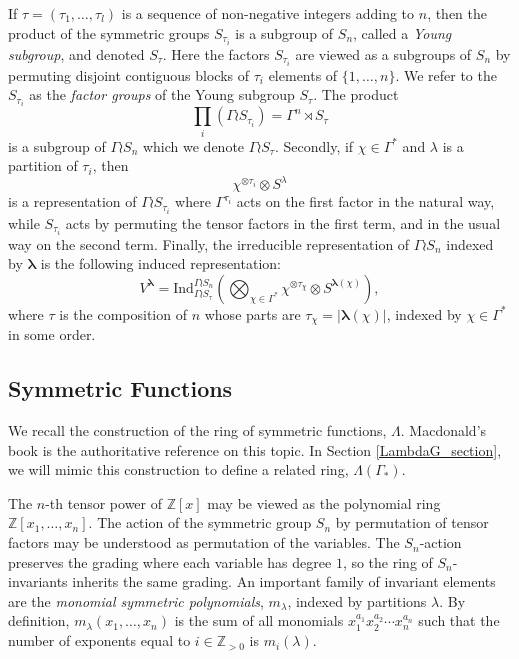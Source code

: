 \documentclass[ALCO,Unicode]{cedram}
\newcommand{\bs}{\boldsymbol}
\newcommand{\LambdaG}{\Lambda(\Gamma_*)}
\newcommand{\LambdaG}{\Lambda(\Gamma_*)}
\begin{document}
If $\tau = (\tau_1, \ldots, \tau_l)$ is a sequence of non-negative integers adding to $n$, then the product of the symmetric groups $S_{\tau_i}$ is a subgroup of $S_n$, called a \emph{Young subgroup}, and denoted $S_\tau$. Here the factors $S_{\tau_i}$ are viewed as a subgroups of $S_n$ by permuting disjoint contiguous blocks of $\tau_i$ elements of $\{1,\ldots, n\}$. We refer to the $S_{\tau_i}$ as the \emph{factor groups} of the Young subgroup $S_\tau$. The product
\[
\prod_{i} (\Gamma \wr S_{\tau_i}) = \Gamma^n \rtimes S_\tau
\]
is a subgroup of $\Gamma \wr S_n$ which we denote $\Gamma \wr S_\tau$. Secondly, if $\chi \in \Gamma^*$ and $\lambda$ is a partition of $\tau_i$, then 
\[
\chi^{\otimes \tau_i} \otimes S^{\lambda}
\]
is a representation of $\Gamma \wr S_{\tau_i}$ where $\Gamma^{\tau_i}$ acts on the first factor in the natural way, while $S_{\tau_i}$ acts by permuting the tensor factors in the first term, and in the usual way on the second term. Finally, the irreducible representation of $\Gamma \wr S_n$ indexed by $\bs\lambda$ is the following induced representation:
\[
V^{\bs\lambda} =
\mathrm{Ind}_{\Gamma \wr S_{\tau}}^{\Gamma \wr S_n} \left( \bigotimes_{\chi \in \Gamma^*} \chi^{\otimes \tau_\chi} \otimes S^{\bs\lambda(\chi)}
\right),
\]
where $\tau$ is the composition of $n$ whose parts are $\tau_\chi = |\bs\lambda(\chi)|$, indexed by $\chi \in \Gamma^*$ in some order.


\subsection{Symmetric Functions} 

We recall the construction of the ring of symmetric functions, $\Lambda$. Macdonald's book \cite{Macdonald} is the authoritative reference on this topic. In Section \ref{LambdaG_section}, we will mimic this construction to define a related ring, $\LambdaG$.

The $n$-th tensor power of $\mathbb{Z}[x]$ may be viewed as the polynomial ring $\mathbb{Z}[x_1, \ldots, x_n]$. The action of the symmetric group $S_n$ by permutation of tensor factors may be understood as permutation of the variables. The $S_n$-action preserves the grading where each variable has degree $1$, so the ring of $S_n$-invariants inherits the same grading. An important family of invariant elements are the \emph{monomial symmetric polynomials}, $m_\lambda$, indexed by partitions $\lambda$. By definition, $m_\lambda(x_1, \ldots, x_n)$ is the sum of all monomials $x_1^{a_1} x_2^{a_2} \cdots x_n^{a_n}$ such that the number of exponents equal to $i \in \mathbb{Z}_{>0}$ is $m_i(\lambda)$.
\end{document}
